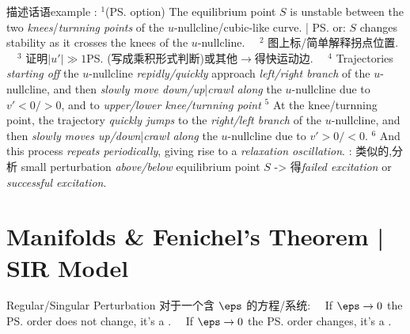 \documentclass{note}
\begin{document}
\begin{MyTh}{描述话语example}
    \tiny {}: $^1$(\ps{option}) The equilibrium point $S$ is unstable between the two \textit{knees}/\textit{turnning points} of the $u$-nullcline/cubic-like curve. | \ps{or}: $S$ changes stability as it crosses the knees of the $u$-nullcline. \ \ $^2$ 图上标/简单解释拐点位置. \ \ $^3$ 证明$|u'|\gg1$\ps{(写成乘积形式判断)}或其他$\to$得快运动边. \ \ $^4$ Trajectories \textit{starting off} the $u$-nullcline \textit{repidly/quickly} approach \textit{left/right branch} of the $u$-nullcline, and then \textit{slowly move down/up}|\textit{crawl along} the $u$-nullcline due to $v'<0/>0$, and to \textit{upper/lower knee/turnning point} $^5$ At the knee/turnning point, the trajectory \textit{quickly jumps} to the \textit{right/left branch} of the $u$-nullcline, and then \textit{slowly moves up/down}|\textit{crawl along} the $u$-nullcline due to $v'>0/<0$. $^6$ And this process \textit{repeats periodically}, giving rise to a \textit{relaxation oscillation}.
    : 类似的,分析 small perturbation \textit{above/below} equilibrium point $S$ -> 得\textit{failed excitation} or \textit{successful excitation}.
\end{MyTh}


\section{Manifolds \& Fenichel's Theorem | SIR Model}

\begin{MyTh}{Regular/Singular Perturbation}
    {\scriptsize 对于一个含 $\eps$ 的方程/系统: \ \ If $\eps\to0$ the \ps{order} does not change, it's a . \ \ If $\eps\to0$ the \ps{order} changes, it's a .}


\end{MyTh}
\end{document}
